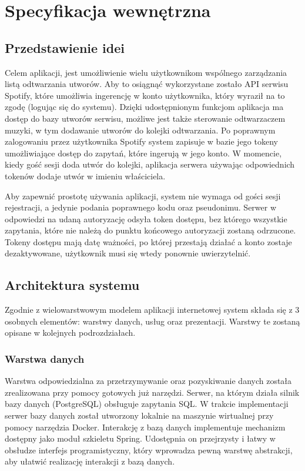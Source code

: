 \chapter{Specyfikacja wewnętrzna}
\label{ch:05}

\section{Przedstawienie idei}
Celem aplikacji, jest umożliwienie wielu użytkownikom wspólnego zarządzania listą odtwarzania utworów. Aby to osiągnąć wykorzystane zostało API serwisu Spotify, które umożliwia ingerencję w konto użytkownika, który wyraził na to zgodę (logując się do systemu). Dzięki udostępnionym funkcjom aplikacja ma dostęp do bazy utworów serwisu, możliwe jest także sterowanie odtwarzaczem muzyki, w tym dodawanie utworów do kolejki odtwarzania. Po poprawnym zalogowaniu przez użytkownika Spotify system zapisuje w bazie jego tokeny umożliwiające dostęp do zapytań, które ingerują w jego konto. W momencie, kiedy gość sesji doda utwór do kolejki, aplikacja serwera używając odpowiednich tokenów dodaje utwór w imieniu właściciela.

Aby zapewnić prostotę używania aplikacji, system nie wymaga od gości sesji rejestracji, a jedynie podania poprawnego kodu oraz pseudonimu. Serwer w odpowiedzi na udaną autoryzację odsyła token dostępu, bez którego wszystkie zapytania, które nie należą do punktu końcowego autoryzacji zostaną odrzucone. Tokeny dostępu mają datę ważności, po której przestają działać a konto zostaje dezaktywowane, użytkownik musi się wtedy ponownie uwierzytelnić.


\section{Architektura systemu}
Zgodnie z wielowarstwowym modelem aplikacji internetowej system składa się z 3 osobnych elementów: warstwy danych, usług oraz prezentacji. Warstwy te zostaną opisane w kolejnych podrozdziałach.
\subsection{Warstwa danych}
Warstwa odpowiedzialna za przetrzymywanie oraz pozyskiwanie danych została zrealizowana przy pomocy gotowych już narzędzi. Serwer, na którym działa silnik bazy danych (PostgreSQL) obsługuje zapytania SQL. W trakcie implementacji serwer bazy danych został utworzony lokalnie na maszynie wirtualnej przy pomocy narzędzia Docker. Interakcję z bazą danych implementuje mechanizm dostępny jako moduł szkieletu Spring. Udostępnia on przejrzysty i łatwy w obsłudze interfejs programistyczny, który wprowadza pewną warstwę abstrakcji, aby ułatwić realizację interakcji z bazą danych.

